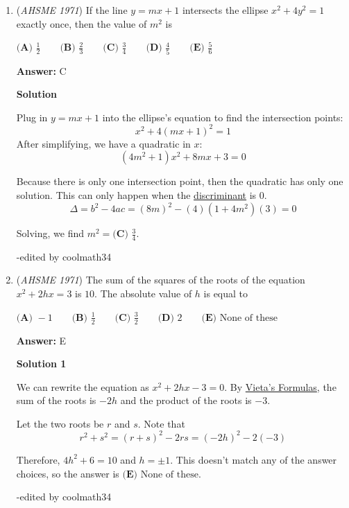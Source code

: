 \begin{enumerate}
 


	\item (\textit{AHSME 1971}) If the line $y=mx+1$ intersects the ellipse $x^2+4y^2=1$ exactly once, then the value of $m^2$ is


 $\textbf{(A) }\textstyle\frac{1}{2}\qquad \textbf{(B) }\frac{2}{3}\qquad \textbf{(C) }\frac{3}{4}\qquad \textbf{(D) }\frac{4}{5}\qquad \textbf{(E) }\frac{5}{6}$

 \textbf{Answer: }C



\textbf{Solution}

Plug in $y=mx+1$ into the ellipse's equation to find the intersection points:
 \[x^2 + 4(mx+1)^2 = 1\]After simplifying, we have a quadratic in $x$:
 \[(4m^2 + 1)x^2 + 8mx  +3 = 0\]

 Because there is only one intersection point, then the quadratic has only one solution. This can only happen when the \href{https://artofproblemsolving.com/wiki/index.php?title=Discriminant}{discriminant} is 0.
 \[\Delta = b^2 - 4ac = (8m)^2 - (4)(1+4m^2)(3) = 0\]

 Solving, we find $m^2 = \boxed{\textbf{(C) }\frac34}.$

 -edited by coolmath34

 


	\item (\textit{AHSME 1971}) The sum of the squares of the roots of the equation $x^2+2hx=3$ is $10$. The absolute value of $h$ is equal to


 $\textbf{(A) }-1\qquad \textbf{(B) }\textstyle\frac{1}{2}\qquad \textbf{(C) }\textstyle\frac{3}{2}\qquad \textbf{(D) }2\qquad \textbf{(E) }\text{None of these}$

 \textbf{Answer: }E



\textbf{Solution 1}

We can rewrite the equation as $x^2 + 2hx - 3 = 0.$ By \href{https://artofproblemsolving.com/wiki/index.php?title=Vieta\%27s\_Formulas}{Vieta's Formulas}, the sum of the roots is $-2h$ and the product of the roots is $-3.$

 Let the two roots be $r$ and $s.$ Note that
 \[r^2 + s^2 = (r+s)^2 - 2rs = (-2h)^2 -2(-3)\]

 Therefore, $4h^2 + 6 = 10$ and $h = \pm 1.$ This doesn't match any of the answer choices, so the answer is $\boxed{\textbf{(E) }\text{None of these}}.$

 -edited by coolmath34

 




\end{enumerate}
